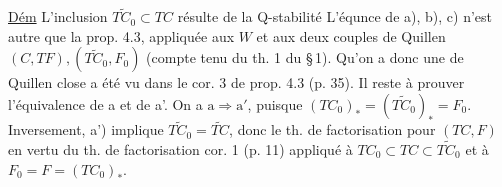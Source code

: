 \uline{Dém} L'inclusion $\widetilde{TC_0}\subset TC$ résulte de la Q-stabilité
L'équnce de a), b), c) n'est autre que
la prop. 4.3, appliquée aux $W$ et aux deux
couples de Quillen $(C,TF),(\widetilde{TC_0},F_0)$ (compte
tenu du th. 1 du \S\,1).  Qu'on a donc
une  de Quillen close a été vu
dans le cor. 3 de prop. 4.3 (p. 35). 
Il reste à prouver l'équivalence de
a et de a'. On a $\mathrm a\Rightarrow\mathrm a'$, puisque
$(TC_0)_*=(\widetilde{TC_0})_*=F_0$.  Inversement,
a') implique $\widetilde{TC_0}=\widetilde{TC}$, donc le th. de
factorisation pour $(TC,F)$ en vertu du
th. de factorisation cor. 1 (p. 11) appliqué à
 $TC_0\subset TC\subset\widetilde{TC_0}$ et à $F_0=F=(TC_0)_*$.

